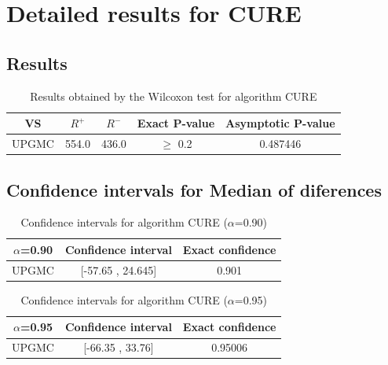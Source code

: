 \documentclass[a4paper,10pt]{article}
\begin{document}
 \clearpage 


\section{Detailed results for CURE}


\subsection{Results}

\begin{table}[!htp]
\centering\small
\begin{tabular}{
|c|c|c|c|c|}
\hline
 VS & $R^{+}$ & $R^{-}$ & Exact P-value & Asymptotic P-value \\ \hline 
UPGMC & 554.0 & 436.0 & $\geq$ 0.2 & 0.487446\\ \hline 

\end{tabular}
\caption{Results obtained by the Wilcoxon test for algorithm CURE}
\end{table}

\subsection{Confidence intervals for Median of diferences}

\begin{table}[!htp]
\centering\small
\begin{tabular}{
|c|c|c|}
\hline
 $\alpha$=0.90 & Confidence interval & Exact confidence \\ \hline 
UPGMC & [-57.65 , 24.645] & 0.901\\ \hline 

\end{tabular}
\caption{Confidence intervals for algorithm CURE ($\alpha$=0.90)}
\end{table}
\begin{table}[!htp]
\centering\small
\begin{tabular}{
|c|c|c|}
\hline
 $\alpha$=0.95 & Confidence interval & Exact confidence \\ \hline 
UPGMC & [-66.35 , 33.76] & 0.95006\\ \hline 

\end{tabular}
\caption{Confidence intervals for algorithm CURE ($\alpha$=0.95)}
\end{table}

 \clearpage 
\end{document}
